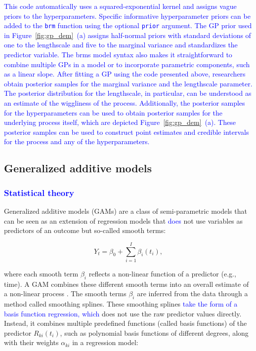 \documentclass[man, floatsintext]{apa7}
\begin{document}
\noindent\textcolor{blue}{This code
  automatically uses a squared-exponential kernel and assigns vague priors to
  the hyperparameters. Specific informative hyperparameter priors can be added
  to the {\fontsize{10}{12}\selectfont\texttt{brm}} function using the optional
    {\fontsize{10}{12}\selectfont\texttt{prior}} argument. The GP prior used in
  Figure~\ref{fig:gp_dem}~(a) assigns half-normal priors with standard
  deviations of one to the lengthscale and five to the marginal variance and
  standardizes the predictor variable. The brms model syntax also
  makes it straightforward to combine multiple GPs in a model or to incorporate
  parametric components, such as a linear slope. After fitting a GP using the
  code presented above, researchers obtain posterior samples for the marginal
  variance and the lengthscale parameter. The posterior distribution for the
  lengthscale, in particular, can be understood as an estimate of the
  wiggliness of the process. Additionally, the posterior samples for the
  hyperparameters can be used to obtain posterior samples for the
  underlying process itself, which are depicted Figure~\ref{fig:gp_dem}~(a).
  These posterior samples can be used to construct
  point estimates and credible intervals for the process and any of the
  hyperparameters.
}

\subsection{Generalized additive models}

\subsubsection{\textcolor{blue}{Statistical theory}}

Generalized additive models (GAMs) are a class of semi-parametric models that
can be seen as an extension of regression models that \textcolor{blue}{does}
not use variables as predictors of an outcome but so-called smooth terms:

\begin{equation}
  Y_t = \beta_0 + \sum_{i = 1}^{I} \beta_i(t_i),
\end{equation}

\noindent where each smooth term $\beta_i$ reflects a non-linear function of a
predictor (e.g., time). A GAM combines these different smooth terms into an
overall estimate of a non-linear process \parencite{wood_generalized_2006,
  wood_inference_2020, hastie_generalized_1999}. The smooth terms $\beta_i$ are
inferred from the data through a method called smoothing splines. These
smoothing splines \textcolor{blue}{take the form of a basis function
  regression, which
} does not use the raw predictor values directly. Instead, it
combines multiple predefined functions (called basis functions) of the
predictor $R_{ki}(t_i)$, such as polynomial basis functions of different
degrees, along with their weights $\alpha_{ki}$ in a regression model:
\end{document}
